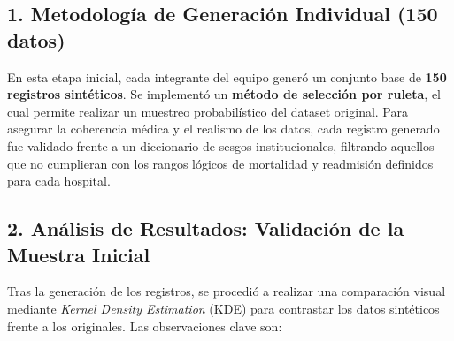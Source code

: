 \documentclass[12pt]{article}
\begin{document}
\subsection*{1. Metodología de Generación Individual (150 datos)}
En esta etapa inicial, cada integrante del equipo generó un conjunto base de \textbf{150 registros sintéticos}. Se implementó un \textbf{método de selección por ruleta}, el cual permite realizar un muestreo probabilístico del dataset original. Para asegurar la coherencia médica y el realismo de los datos, cada registro generado fue validado frente a un diccionario de sesgos institucionales, filtrando aquellos que no cumplieran con los rangos lógicos de mortalidad y readmisión definidos para cada hospital.

\subsection*{2. Análisis de Resultados: Validación de la Muestra Inicial}
Tras la generación de los registros, se procedió a realizar una comparación visual mediante \textit{Kernel Density Estimation} (KDE) para contrastar los datos sintéticos frente a los originales. Las observaciones clave son:
\end{document}
